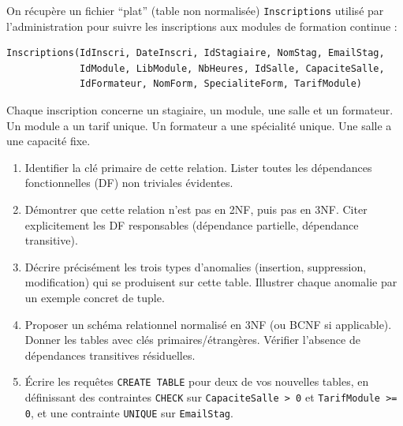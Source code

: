 \documentclass[11pt]{article}
\begin{document}
\begin{exercice}
On récupère un fichier ``plat'' (table non normalisée) \texttt{Inscriptions} utilisé par l'administration pour suivre les inscriptions aux modules de formation continue :
\begin{verbatim}
Inscriptions(IdInscri, DateInscri, IdStagiaire, NomStag, EmailStag, 
             IdModule, LibModule, NbHeures, IdSalle, CapaciteSalle, 
             IdFormateur, NomForm, SpecialiteForm, TarifModule)
\end{verbatim}
Chaque inscription concerne un stagiaire, un module, une salle et un formateur. Un module a un tarif unique. Un formateur a une spécialité unique. Une salle a une capacité fixe.
\begin{enumerate}
    \item Identifier la clé primaire de cette relation. Lister toutes les dépendances fonctionnelles (DF) non triviales évidentes.
    \item Démontrer que cette relation n'est pas en 2NF, puis pas en 3NF. Citer explicitement les DF responsables (dépendance partielle, dépendance transitive).
    \item Décrire précisément les trois types d'anomalies (insertion, suppression, modification) qui se produisent sur cette table. Illustrer chaque anomalie par un exemple concret de tuple.
    \item Proposer un schéma relationnel normalisé en 3NF (ou BCNF si applicable). Donner les tables avec clés primaires/étrangères. Vérifier l'absence de dépendances transitives résiduelles.
    \item Écrire les requêtes \texttt{CREATE TABLE} pour deux de vos nouvelles tables, en définissant des contraintes \texttt{CHECK} sur \texttt{CapaciteSalle > 0} et \texttt{TarifModule >= 0}, et une contrainte \texttt{UNIQUE} sur \texttt{EmailStag}.
\end{enumerate}
\end{exercice}
\end{document}
